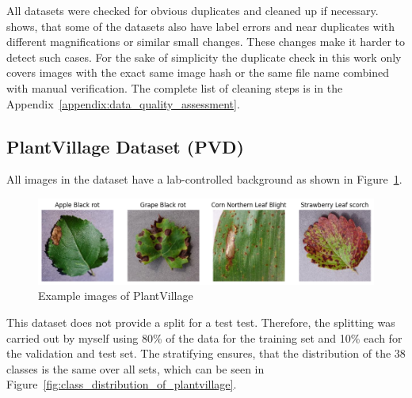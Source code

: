 All datasets were checked for obvious duplicates and cleaned up if necessary. \autocite{groeger2023} shows, that some of the datasets also have label errors and near duplicates with different magnifications or similar small changes. These changes make it harder to detect such cases. For the sake of simplicity the duplicate check in this work only covers images with the exact same image hash or the same file name combined with manual verification. The complete list of cleaning steps is in the Appendix~\ref{appendix:data_quality_assessment}.

\subsection{PlantVillage Dataset (PVD)}
All images in the dataset have a lab-controlled background as shown in Figure~\ref{fig:example_images_of_plantvillage}.

\begin{figure}[H]
    \begin{center}
    \includegraphics[width=15cm]{../images/example_images_of_plantvillage.png}
    \caption{Example images of PlantVillage}
   \label{fig:example_images_of_plantvillage}
    \end{center}
\end{figure}

This dataset does not provide a split for a test test. Therefore, the splitting was carried out by myself using 80\% of the data for the training set and 10\% each for the validation and test set. The stratifying ensures, that the distribution of the 38 classes is the same over all sets, which can be seen in Figure~\ref{fig:class_distribution_of_plantvillage}. 

